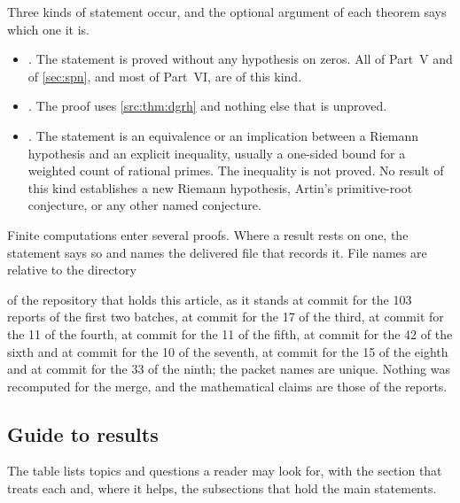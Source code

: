 Three kinds of statement occur, and the optional argument of each theorem says which one it
is.
\begin{itemize}[leftmargin=2em]
\item \emph{\stU.} The statement is proved without any hypothesis on zeros. All of
  Part~V and of \cref{sec:spn}, and most of Part~VI, are of this kind.
\item \emph{\stG.} The proof uses \cref{src:thm:dgrh} and nothing else that is unproved.
\item \emph{\stR.} The statement is an equivalence or an implication between a Riemann
  hypothesis and an explicit inequality, usually a one-sided bound for a weighted count of
  rational primes. The inequality is not proved. No result of this kind establishes a new
  Riemann hypothesis, Artin's primitive-root conjecture, or any other named conjecture.
\end{itemize}
Finite computations enter several proofs. Where a result rests on one, the statement says
so and names the delivered file that records it. File names are relative to the directory
\begin{center}
\end{center}
of the repository that holds this article, as it stands at commit  for the
103 reports of the first two batches, at commit  for the 17 of the third, at
commit  for the 11 of the fourth, at commit  for the 11 of the
fifth, at commit  for the 42 of the sixth and at commit  for the 10 of
the seventh, at commit  for the 15 of the eighth and at commit  for the 33 of the
ninth; the packet names are unique. Nothing was recomputed for the
merge, and the mathematical claims are those of the reports.

\subsection{Guide to results}\label{intro:sec:guide}

The table lists topics and questions a reader may look for, with the section that treats each
and, where it helps, the subsections that hold the main statements.

